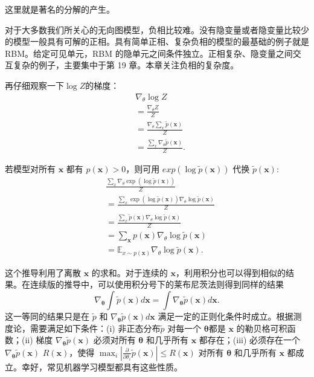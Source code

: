 这里就是著名的分解的产生。

对于大多数我们所关心的无向图模型，负相比较难。没有隐变量或者隐变量比较少的模型一般具有可解的正相。具有简单正相、复杂负相的模型的最基础的例子就是 RBM。给定可见单元，RBM 的隐单元之间条件独立。正相复杂、隐变量之间交互复杂的例子，主要集中于第 19 章。本章关注负相的复杂度。

再仔细观察一下\(\log Z\)的梯度：
\begin{align}
    & \nabla_\theta \log{Z}                                \\
    & = \frac{\nabla_\theta Z}{Z}                          \\
    & = \frac{\nabla_\theta\sum_x\widetilde{p}(\bm{x})}{Z} \\
    & = \frac{\sum_x\nabla_\theta\widetilde{p}(\bm{x})}{Z}.
\end{align}

若模型对所有 \(\bm{x}\) 都有 \(p(\bm{x})>0\)，则可用 \(exp(\log\widetilde{p}(\bm{x}))\) 代换 \(\widetilde{p}(\bm{x})\):
\begin{align}
& \frac{\sum_x\nabla_\theta\exp(
    \log{\widetilde{p}(\bm{x})})}{Z}             \\
& = \frac{\sum_x\exp(\log{\widetilde{p}(\bm{x})})
    \nabla_\theta\log{\widetilde{p}(\bm{x})}}{Z} \\
& = \frac{\sum_x\widetilde{p}(\bm{x})
    \nabla_\theta\log\widetilde{p}(\bm{x})}{Z}   \\
& = \sum_{\bm{x}}p(\bm{x})
    \nabla_\theta\log\widetilde{p}(\bm{x})       \\
& = \mathbb{E}_{x\sim{}p(\bm{x})}
    \nabla_\theta\log\widetilde{p}(\bm{x}).
\end{align}

这个推导利用了离散 \(\bm{x}\) 的求和。对于连续的 \(\bm{x}\)，利用积分也可以得到相似的结果。在连续版的推导中，可以使用积分号下的莱布尼茨法则得到同样的结果
\begin{equation}
    \nabla_{\bm{\theta}}\int\widetilde{p}(\bm{x})d\bm{x}
    = \int\nabla_{\bm\theta}\widetilde{p}(\bm{x})d\bm{x}.
\end{equation}
这一等同的结果只是在 \( \widetilde{p} \) 和 \( \nabla_{\bm\theta}\widetilde{p}(\bm{x})d\bm{x} \) 满足一定的正则化条件时成立。根据测度论，需要满足如下条件：(i) 非正态分布\( \widetilde{p} \) 对每一个 \(\bm{\theta}\)都是 \(\bm{x}\) 的勒贝格可积函数；(ii) 梯度 \( \nabla_{\bm\theta}\widetilde{p}(\bm{x}) \) 必须对所有 \(\bm\theta\) 和几乎所有 \(\bm x\) 都存在；(iii) 必须存在一个 \( \nabla_{\bm\theta}\widetilde{p}(\bm{x}) \)  \(R({\bm x})\)，使得 \(\max_i|\frac{\partial}{\partial \theta_i}\widetilde{p}(\bm{x})| \leq R(\bm{x}) \) 对所有 \(\bm\theta\) 和几乎所有 \(\bm x\) 都成立。幸好，常见机器学习模型都具有这些性质。

